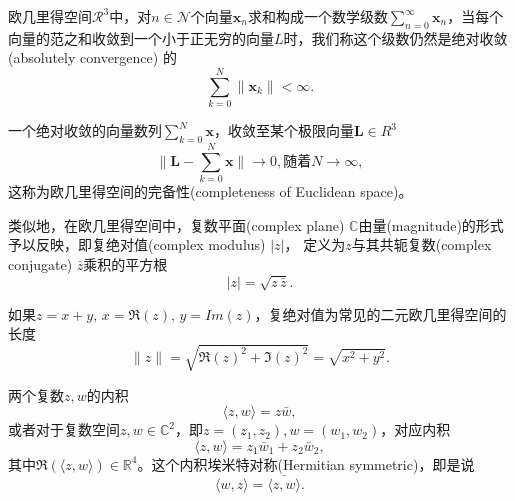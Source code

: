 欧几里得空间$\mathcal{R}^3$中，对$n \in \mathcal{N}$个向量$\bm{x}_n$求和构成一个数学级数$\sum_{n=0}^{\infty} \bm{x}_n$，当每个向量的范之和收敛到一个小于正无穷的向量$L$时，我们称这个级数仍然是绝对收敛(absolutely convergence) 的
\begin{equation*}
  \sum_{k=0}^{N} \| \bm{x}_k \| < \infty.
\end{equation*}

一个绝对收敛的向量数列$\sum_{k=0}^{N} \bm{x}$，收敛至某个极限向量$\bm{L} \in R^3$
\begin{equation*}
  \Big\| \bm{L} -  \sum_{k=0}^{N} \bm{x}\Big\| \rightarrow 0, \text{随着} N \rightarrow \infty,
\end{equation*}
这称为欧几里得空间的完备性(completeness of Euclidean space)。

类似地，在欧几里得空间中，复数平面(complex plane) $\mathbb{C}$由量(magnitude)的形式予以反映，即复绝对值(complex modulus) $\left| z \right|$， 定义为$z$与其共轭复数(complex conjugate) $\bar{z}$乘积的平方根
\begin{equation*}
  \left| z \right| = \sqrt{z \, \bar{z}}.
\end{equation*}

如果$z=x+y, \, x=\Re{(z)}, \, y=Im{(z)}$，复绝对值为常见的二元欧几里得空间的长度
\begin{equation*}
  \| z \| = \sqrt{\Re{(z)^2} + \Im{(z)^2}} = \sqrt{x^2 + y^2}.
\end{equation*}

两个复数$z,w$的内积
\begin{equation*}
  \langle z, w \rangle = z \bar{w},
\end{equation*}
或者对于复数空间$z, w \in \mathbb{C}^2$，即$z=(z_1,z_2),w=(w_1,w_2)$，对应内积
\begin{equation*}
  \langle z, w \rangle = z_1 \bar{w}_1 + z_2 \bar{w}_2,
\end{equation*}
其中$\Re(\langle z, w \rangle) \in \mathbb{R}^4$。这个内积埃米特对称(Hermitian symmetric)，即是说
\begin{equation*}
  \langle w,z \rangle = \overline{\langle z,w \rangle}.
\end{equation*}

